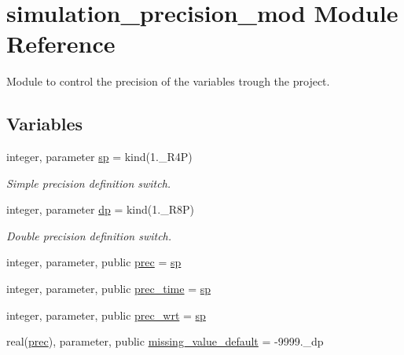 \hypertarget{namespacesimulation__precision__mod}{}\section{simulation\+\_\+precision\+\_\+mod Module Reference}
\label{namespacesimulation__precision__mod}


Module to control the precision of the variables trough the project.  


\subsection*{Variables}
\begin{DoxyCompactItemize}
\item 
integer, parameter \mbox{\hyperlink{namespacesimulation__precision__mod_a15b1ab993f9b11430e9d9d3dc6c77614}{sp}} = kind(1.\+\_\+\+R4P)
\begin{DoxyCompactList}\small\item\em Simple precision definition switch. \end{DoxyCompactList}\item 
integer, parameter \mbox{\hyperlink{namespacesimulation__precision__mod_a4d49b0033a5e2bc6693c5b2dfb63a032}{dp}} = kind(1.\+\_\+\+R8P)
\begin{DoxyCompactList}\small\item\em Double precision definition switch. \end{DoxyCompactList}\item 
integer, parameter, public \mbox{\hyperlink{namespacesimulation__precision__mod_aaff1ddf996761a1e11e787d63e1612f6}{prec}} = \mbox{\hyperlink{namespacesimulation__precision__mod_a15b1ab993f9b11430e9d9d3dc6c77614}{sp}}
\item 
integer, parameter, public \mbox{\hyperlink{namespacesimulation__precision__mod_a3833ad1bc52c3738ac861591b7492737}{prec\+\_\+time}} = \mbox{\hyperlink{namespacesimulation__precision__mod_a15b1ab993f9b11430e9d9d3dc6c77614}{sp}}
\item 
integer, parameter, public \mbox{\hyperlink{namespacesimulation__precision__mod_ad515822198607dfee68a6ed8b246c7da}{prec\+\_\+wrt}} = \mbox{\hyperlink{namespacesimulation__precision__mod_a15b1ab993f9b11430e9d9d3dc6c77614}{sp}}
\item 
real(\mbox{\hyperlink{namespacesimulation__precision__mod_aaff1ddf996761a1e11e787d63e1612f6}{prec}}), parameter, public \mbox{\hyperlink{namespacesimulation__precision__mod_a1fb0f91226452bb43d4c61cae32a9a6d}{missing\+\_\+value\+\_\+default}} = -\/9999.\+\_\+dp

\end{DoxyCompactItemize}
